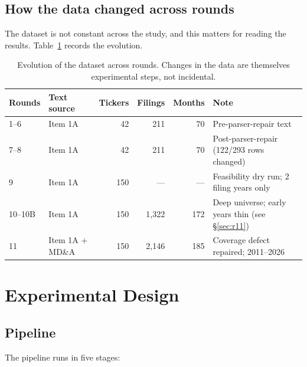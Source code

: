 \documentclass[11pt]{article}
\begin{document}
\subsection{How the data changed across rounds}

The dataset is not constant across the study, and this matters for reading the results.
Table~\ref{tab:datarounds} records the evolution.

\begin{table}[H]
\centering\small
\caption{Evolution of the dataset across rounds. Changes in the data are themselves
experimental steps, not incidental.}
\label{tab:datarounds}
\setlength{\tabcolsep}{5pt}\footnotesize
\begin{tabular}{l l r r r l}
\toprule
\textbf{Rounds} & \textbf{Text source} & \textbf{Tickers} & \textbf{Filings} & \textbf{Months} & \textbf{Note} \\
\midrule
1--6   & Item 1A & 42  & 211   & 70  & Pre-parser-repair text \\
7--8   & Item 1A & 42  & 211   & 70  & Post-parser-repair (122/293 rows changed) \\
9      & Item 1A & 150 & ---   & --- & Feasibility dry run; 2 filing years only \\
10--10B& Item 1A & 150 & 1,322 & 172 & Deep universe; early years thin (see \S\ref{sec:r11}) \\
11     & Item 1A + MD\&A & 150 & 2,146 & 185 & Coverage defect repaired; 2011--2026 \\
\bottomrule
\end{tabular}
\end{table}

\section{Experimental Design}
\label{sec:design}

\subsection{Pipeline}

The pipeline runs in five stages:
\end{document}
